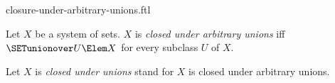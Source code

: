 \documentclass{stex}
\begin{document}
\begin{smodule}{closure-under-arbitrary-unions.ftl}

\begin{definition}[forthel,id=FOUNDATIONS_14_3959378992431104]
  Let $X$ be a system of sets.
  $X$ is \emph{closed under arbitrary unions} iff $\SETunionover U \Elem X$ for every  subclass $U$ of $X$.

  Let $X$ is \emph{closed under unions} stand for $X$ is closed under arbitrary unions.
\end{definition}
\end{smodule}
\end{document}
